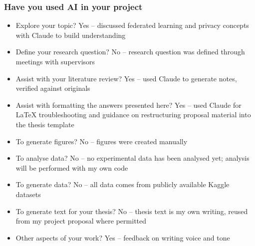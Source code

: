 \documentclass[12pt,openany,a4paper]{book}
\begin{document}
\subsubsection*{Have you used AI in your project}
\begin{itemize}
  \item Explore your topic? Yes -- discussed federated learning and privacy concepts with Claude to build understanding
  \item Define your research question? No -- research question was defined through meetings with supervisors
  \item Assist with your literature review? Yes -- used Claude to generate notes, verified against originals
  \item Assist with formatting the answers presented here? Yes -- used Claude for LaTeX troubleshooting and guidance on restructuring proposal material into the thesis template
  \item To generate figures? No -- figures were created manually
  \item To analyse data? No -- no experimental data has been analysed yet; analysis will be performed with my own code
  \item To generate data? No -- all data comes from publicly available Kaggle datasets
  \item To generate text for your thesis? No -- thesis text is my own writing, reused from my project proposal where permitted
  \item Other aspects of your work? Yes -- feedback on writing voice and tone
\end{itemize}

\newpage


\let\origcleardoublepage\cleardoublepage
\let\cleardoublepage\clearpage
\frontmatter
\let\cleardoublepage\origcleardoublepage
\end{document}
